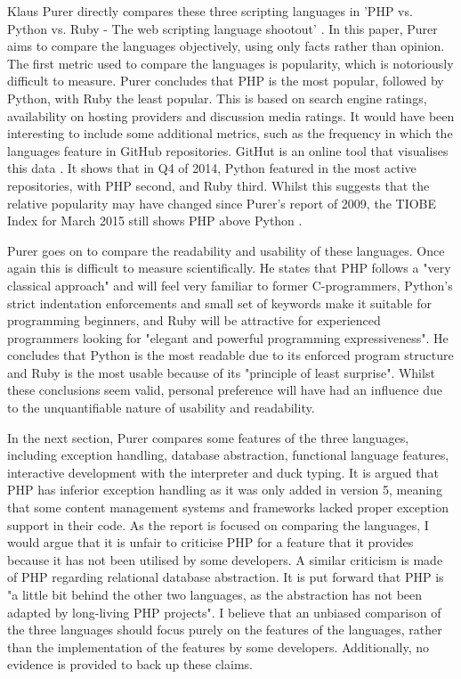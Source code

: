 \documentclass[authoryearcitations]{UoYCSproject}
\begin{document}
Klaus Purer directly compares these three scripting languages in 'PHP vs. Python vs. Ruby - The web scripting language shootout' \citep{Purer2009}. In this paper, Purer aims to compare the languages objectively, using only facts rather than opinion. The first metric used to compare the languages is popularity, which is notoriously difficult to measure. Purer concludes that PHP is the most popular, followed by Python, with Ruby the least popular. This is based on search engine ratings, availability on hosting providers and discussion media ratings. It would have been interesting to include some additional metrics, such as the frequency in which the languages feature in GitHub repositories. GitHut is an online tool that visualises this data \citep{Zapponi2014}. It shows that in Q4 of 2014, Python featured in the most active repositories, with PHP second, and Ruby third. Whilst this suggests that the relative popularity may have changed since Purer's report of 2009, the TIOBE Index for March 2015 still shows PHP above Python \citep{TIOBESoftware2015}. 

Purer goes on to compare the readability and usability of these languages. Once again this is difficult to measure scientifically. He states that PHP follows a "very classical approach" and will feel very familiar to former C-programmers, Python's strict indentation enforcements and small set of keywords make it suitable for programming beginners, and Ruby will be attractive for experienced programmers looking for "elegant and powerful programming expressiveness". He concludes that Python is the most readable due to its enforced program structure and Ruby is the most usable because of its "principle of least surprise". Whilst these conclusions seem valid, personal preference will have had an influence due to the unquantifiable nature of usability and readability. 

In the next section, Purer compares some features of the three languages, including exception handling, database abstraction, functional language features, interactive development  with the interpreter and duck typing. It is argued that PHP has inferior exception handling as it was only added in version 5, meaning that some content management systems and frameworks lacked proper exception support in their code. As the report is focused on comparing the languages, I would argue that it is unfair to criticise PHP for a feature that it provides because it has not been utilised by some developers. A similar criticism is made of PHP regarding relational database abstraction. It is put forward that PHP is "a little bit behind the other two languages, as the abstraction has not been adapted by long-living PHP projects". I believe that an unbiased comparison of the three languages should focus purely on the features of the languages, rather than the implementation of the features by some developers. Additionally, no evidence is provided to back up these claims. 
\end{document}
